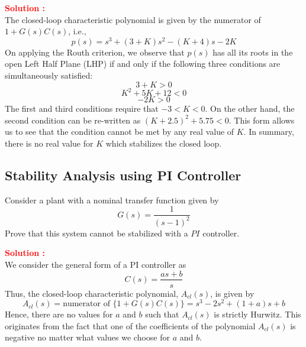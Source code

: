 \documentclass[12pt]{article}
\begin{document}
\textbf{\textcolor{red}{Solution :}} \\  
The closed-loop characteristic polynomial is given by the numerator of \(1 + G(s)C(s)\), i.e.,
\begin{equation}
p(s) = s^3 + (3 + K)s^2 - (K + 4)s - 2K
\end{equation}
On applying the Routh criterion, we observe that \(p(s)\) has all its roots in the open Left Half Plane (LHP) if and only if the following three conditions are simultaneously satisfied:
\begin{equation}
3 + K > 0
\end{equation}
\begin{equation}
K^2 + 5K + 12 < 0
\end{equation}
\begin{equation}
-2K > 0
\end{equation}
The first and third conditions require that \(-3 < K < 0\). On the other hand, the second condition can be re-written as \((K + 2.5)^2 + 5.75 < 0\). This form allows us to see that the condition cannot be met by any real value of \(K\). In summary, there is no real value for \(K\) which stabilizes the closed loop.

\clearpage
\subsection{Stability Analysis using PI Controller}

Consider a plant with a nominal transfer function given by
\begin{equation}
G(s) = \frac{1}{(s - 1)^2}
\end{equation}
Prove that this system cannot be stabilized with a \(PI\) controller.

\textbf{\textcolor{red}{Solution :}} \\ 
We consider the general form of a PI controller as
\begin{equation}
C(s) = \frac{as + b}{s}
\end{equation}
Thus, the closed-loop characteristic polynomial, \(A_{cl}(s)\), is given by
\begin{equation}
A_{cl}(s) = \text{numerator of } \{1 + G(s)C(s)\} = s^3 - 2s^2 + (1 + a)s + b
\end{equation}
Hence, there are no values for \(a\) and \(b\) such that \(A_{cl}(s)\) is strictly Hurwitz. This originates from the fact that one of the coefficients of the polynomial \(A_{cl}(s)\) is negative no matter what values we choose for \(a\) and \(b\).
\end{document}
